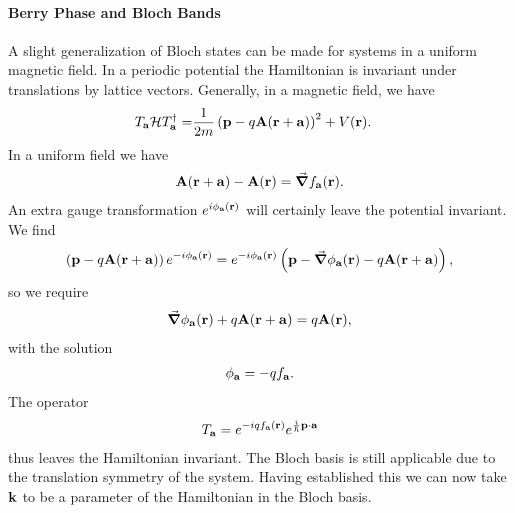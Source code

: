 \paragraph{Berry Phase and Bloch Bands}
A slight generalization of Bloch states can be made for systems in a uniform magnetic field. In a periodic potential the Hamiltonian is invariant under translations by lattice vectors. Generally, in a magnetic field, we have
\begin{align*}
	T_{\vb{a}}\mathcal{H} T_{\vb{a}}^{\dagger} =& \frac{1}{2m}\left(\vb{p} - q\vb{A}(\vb{r} + \vb{a})\right)^{2} + V(\vb{r}).
\end{align*}
In a uniform field we have
\begin{align*}
	\vb{A}(\vb{r} + \vb{a}) - \vb{A}(\vb{r}) = \grad{f_{\vb{a}}}(\vb{r}).
\end{align*}
An extra gauge transformation $e^{i\phi_{\vb{a}}(\vb{r})}$ will certainly leave the potential invariant. We find
\begin{align*}
	\left(\vb{p} - q\vb{A}(\vb{r} + \vb{a})\right)e^{-i\phi_{\vb{a}}(\vb{r})} = e^{-i\phi_{\vb{a}}(\vb{r})}\left(\vb{p} - \grad{\phi_{\vb{a}}(\vb{r})} - q\vb{A}(\vb{r} + \vb{a})\right),
\end{align*}
so we require
\begin{align*}
	\grad{\phi_{\vb{a}}(\vb{r})} + q\vb{A}(\vb{r} + \vb{a}) = q\vb{A}(\vb{r}),
\end{align*}
with the solution
\begin{align*}
	\phi_{\vb{a}} = -qf_{\vb{a}}.
\end{align*}
The operator
\begin{align*}
	T_{\vb{a}} = e^{-iqf_{\vb{a}}(\vb{r})}e^{\frac{i}{\hbar}\vb{p}\cdot\vb{a}}
\end{align*}
thus leaves the Hamiltonian invariant. The Bloch basis is still applicable due to the translation symmetry of the system. Having established this we can now take $\vb{k}$ to be a parameter of the Hamiltonian in the Bloch basis.


